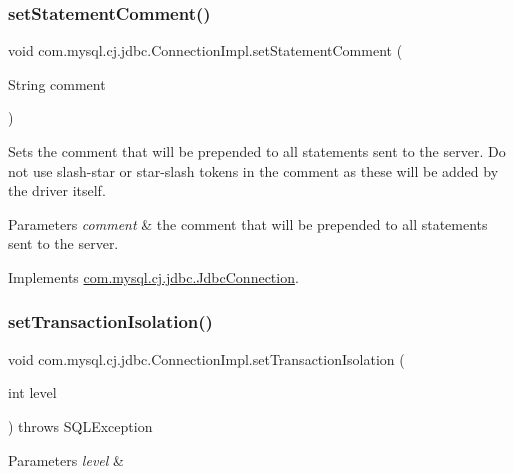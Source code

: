\subsubsection{\texorpdfstring{set\+Statement\+Comment()}{setStatementComment()}}
{\footnotesize\ttfamily void com.\+mysql.\+cj.\+jdbc.\+Connection\+Impl.\+set\+Statement\+Comment (\begin{DoxyParamCaption}\item[{String}]{comment }\end{DoxyParamCaption})}

Sets the comment that will be prepended to all statements sent to the server. Do not use slash-\/star or star-\/slash tokens in the comment as these will be added by the driver itself.


\begin{DoxyParams}{Parameters}
{\em comment} & the comment that will be prepended to all statements sent to the server. \\
\hline
\end{DoxyParams}


Implements \mbox{\hyperlink{interfacecom_1_1mysql_1_1cj_1_1jdbc_1_1_jdbc_connection_adfbd59fbebd013673ed3eb97beb76179}{com.\+mysql.\+cj.\+jdbc.\+Jdbc\+Connection}}.

\mbox{\label{classcom_1_1mysql_1_1cj_1_1jdbc_1_1_connection_impl_a5555f54beb90978116a2c340a4f11ff3}} 
\subsubsection{\texorpdfstring{set\+Transaction\+Isolation()}{setTransactionIsolation()}}
{\footnotesize\ttfamily void com.\+mysql.\+cj.\+jdbc.\+Connection\+Impl.\+set\+Transaction\+Isolation (\begin{DoxyParamCaption}\item[{int}]{level }\end{DoxyParamCaption}) throws S\+Q\+L\+Exception}


\begin{DoxyParams}{Parameters}
{\em level} & \\
\hline
\end{DoxyParams}

